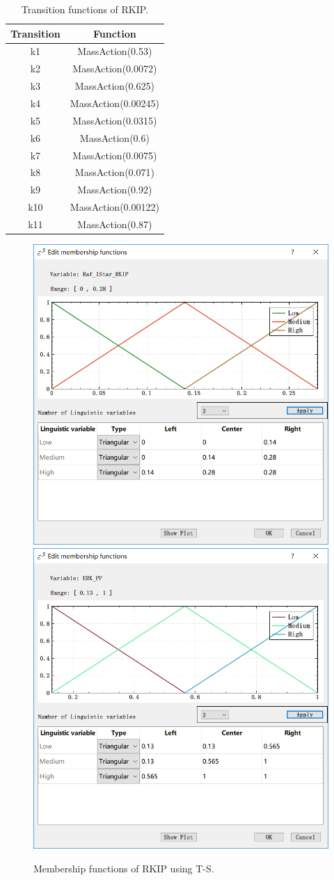 \documentclass[journal,a4paper,onecolumn]{article}
\begin{document}
\begin{table}[!hbt]
	\begin{center}
		\caption{Transition functions of RKIP.}
		\label{Transition functions of RKIP}
		\begin{tabular}{|c|c|}
			\hline
			Transition&Function\\
			\hline
			k1&MassAction(0.53)\\
			\hline
						k2&MassAction(0.0072)\\
			\hline
						k3&MassAction(0.625)\\
			\hline
						k4&MassAction(0.00245)\\
			\hline
						k5&MassAction(0.0315)\\
			\hline
						k6&MassAction(0.6)\\
			\hline
						k7&MassAction(0.0075)\\
			\hline
						k8&MassAction(0.071)\\
			\hline
						k9&MassAction(0.92)\\
			\hline
						k10&MassAction(0.00122)\\
			\hline
						k11&MassAction(0.87)\\
			\hline
		\end{tabular}
	\end{center}
\end{table}

\begin{figure}[!hbt]
	\begin{center}
		\includegraphics[width=0.45\columnwidth]{fig44}
		\includegraphics[width=0.45\columnwidth]{fig45}
		\caption{Membership functions of RKIP using T-S.}
		\label{fig:Membership functions of RKIP using T-S.}
	\end{center}
\end{figure}
\end{document}
